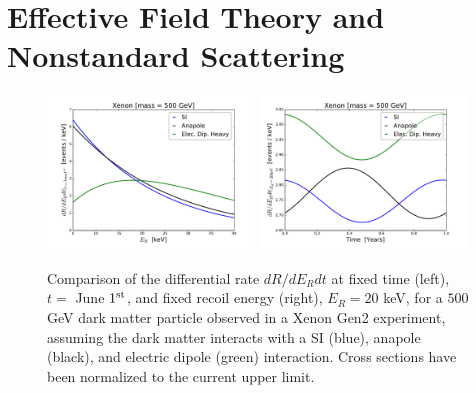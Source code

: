 \documentclass[11pt]{article}
\begin{document}
\section{Effective Field Theory and Nonstandard Scattering}\label{sec:eft}

\begin{figure}
\centering
\includegraphics[width=0.49\textwidth, trim=1.cm 0.0cm 0.7cm 0.4cm,clip=true]{plots/RecoilComparison.pdf}
\includegraphics[width=0.49\textwidth, trim=0.7cm 0.0cm 1.cm 0.4cm,clip=true]{plots/TimeComparison.pdf}
\caption{\label{fig:diff_rate_comp}
Comparison of the differential rate $dR/dE_{R}dt$ at fixed time (left), $t =$ June $1^{\rm st}$, and fixed recoil energy (right), $E_R = 20$ keV, for a $500$ GeV dark matter particle observed in a Xenon Gen2 experiment, assuming the dark matter interacts with a SI (blue), anapole (black), and electric dipole (green) interaction. Cross sections have been normalized to the current upper limit.}
\end{figure}
\end{document}
